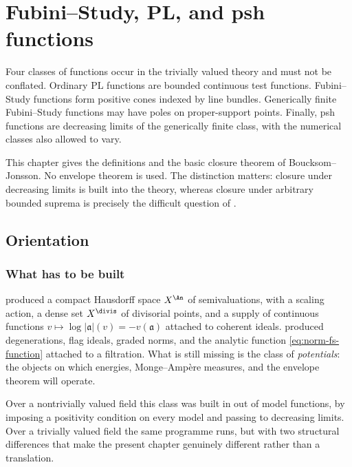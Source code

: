 \chapter{Fubini--Study, PL, and psh functions}
\label{chap:bj-fs-pl-psh}

Four classes of functions occur in the trivially valued theory and must not
be conflated.  Ordinary PL functions are bounded continuous test functions.
Fubini--Study functions form positive cones indexed by line bundles.
Generically finite Fubini--Study functions may have poles on
proper-support points.  Finally, psh functions are decreasing limits of the
generically finite class, with the numerical classes also allowed to vary.

This chapter gives the definitions and the basic closure theorem of
Boucksom--Jonsson.  No envelope theorem is used.  The distinction matters:
closure under decreasing limits is built into the theory, whereas closure
under arbitrary bounded suprema is precisely the difficult question of
.

\section{Orientation}
\label{sec:ch34-orientation}

\subsection{What has to be built}
\label{sec:ch34-what}

 produced a compact Hausdorff space
$X^{\An}$ of semivaluations, with a scaling action, a dense set
$X^{\divis}$ of divisorial points, and a supply of continuous functions
$v\mapsto\log|\mathfrak a|(v)=-v(\mathfrak a)$ attached to coherent
ideals.   produced degenerations, flag
ideals, graded norms, and the analytic function
\eqref{eq:norm-fs-function} attached to a filtration.  What is still
missing is the class of \emph{potentials}: the objects on which energies,
Monge--Amp\`ere measures, and the envelope theorem will operate.

Over a nontrivially valued field this class was built in
 out of model functions, by imposing a positivity
condition on every model and passing to decreasing limits.  Over a trivially
valued field the same programme runs, but with two structural differences
that make the present chapter genuinely different rather than a translation.

